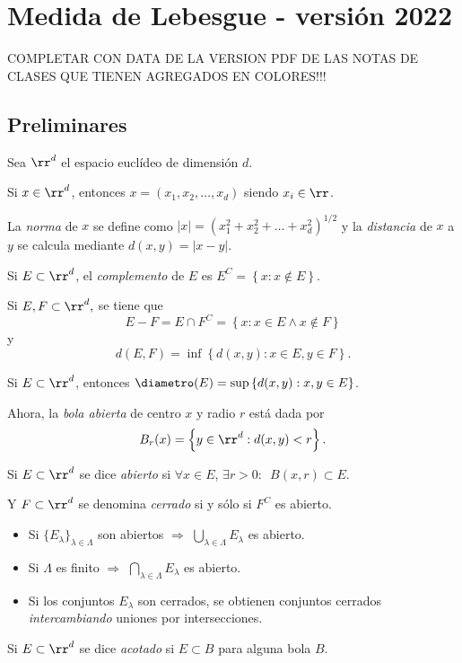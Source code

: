 \chapter{Medida de Lebesgue -  versi\'on 2022}

COMPLETAR CON DATA DE LA  VERSION PDF DE LAS NOTAS DE CLASES QUE TIENEN
 AGREGADOS EN COLORES!!!


\section{Preliminares}
Sea $\rr^d$ el espacio eucl\'ideo de dimensi\'on $d$. 

Si $x \in \rr^d$, entonces $x=(x_1,x_2,\ldots,x_d)$ siendo $x_i\in \rr$.

La \emph{norma} de $x$ se define como $|x|=\left(x_1^2+x_2^2+\ldots+x_d^2\right)^{1/2}$ y la \emph{distancia} de $x$ a $y$
se calcula mediante $d(x,y)=|x-y|$.

Si $E\subset \rr^d$, el \emph{complemento} de $E$ es 
$E^C=\left\{ x:x\notin E\right\}$.

Si $E,F\subset \rr^d,$ se tiene que 
$$E-F=E\cap F^C=\left\{x: x\in E \wedge x \notin F\right\}$$ y 
$$d(E,F)=\inf \left\{d(x,y):x\in E, y \in F \right\}.$$

Si $E \subset \rr^d$, entonces $\diametro(E)=\sup\left\{ d(x,y): x,y \in E \right\}$.

Ahora, la \emph{bola abierta} de centro $x$ y radio $r$ est\'a dada por \[B_r(x)=\left\{y \in \rr^d: d(x,y)<r  \right\}.\]

Si $E \subset  \rr^d$ se dice \emph{abierto} si $\forall x \in E$, $\exists r>0:$\, $B(x,r)\subset E$. 

Y $F \subset \rr^d$ se denomina \emph{cerrado} si y s\'olo si $F^C$ es abierto.

\begin{itemize}
    \item Si $\{E_{\lambda}\}_{\lambda \in \Lambda}$ son abiertos $\Rightarrow$ $ \bigcup\limits_{\lambda \in \Lambda} E_{\lambda}$ 
    es abierto. 
    \item Si $\Lambda$ es finito $\Rightarrow$ $ \bigcap\limits_{\lambda \in \Lambda} E_{\lambda}$ es abierto.
    \item Si los conjuntos $E_{\lambda}$ son cerrados, se obtienen conjuntos cerrados \emph{intercambiando} uniones por intersecciones.
\end{itemize}

Si $E \subset \rr^d$ se dice \emph{acotado} si $E\subset B$ para alguna bola $B$.

